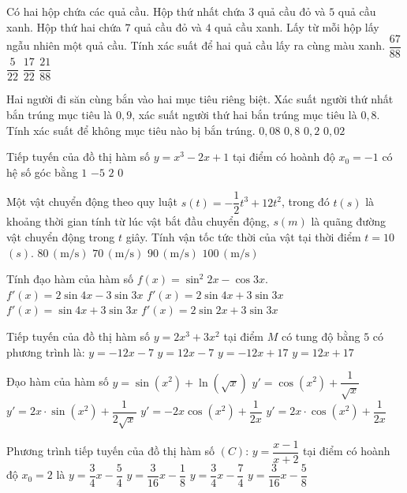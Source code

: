 \begin{ex}
Có hai hộp chứa các quả cầu. Hộp thứ nhất chứa $3$ quả cầu đỏ và $5$ quả cầu xanh. Hộp thứ hai chứa $7$ quả cầu đỏ và $4$ quả cầu xanh. Lấy từ mỗi hộp lấy ngẫu nhiên một quả cầu. Tính xác suất để hai quả cầu lấy ra cùng màu xanh.
\choice
{$\dfrac{67}{88}$}
{$\dfrac{5}{22}$}
{$\dfrac{17}{22}$}
{$\dfrac{21}{88}$}
\end{ex}
\begin{ex}
Hai người đi săn cùng bắn vào hai mục tiêu riêng biệt. Xác suất người thứ nhất bắn trúng mục tiêu là $0{,}9$, xác suất người thứ hai bắn trúng mục tiêu là $0{,}8$. Tính xác suất để không mục tiêu nào bị bắn trúng.
\choice
{$0{,}08$}
{$0{,}8$}
{$0{,}2$}
{$0{,}02$}
\end{ex}
\begin{ex}
Tiếp tuyến của đồ thị hàm số $y=x^3-2x+1$ tại điểm có hoành độ $x_0=-1$ có hệ số góc bằng
\choice
{$1$}
{$-5$}
{$2$}
{$0$}
\end{ex}
\begin{ex}
Một vật chuyển động theo quy luật $s(t)=-\dfrac{1}{2}t^3+12t^2$, trong đó $t(s)$ là khoảng thời gian tính từ lúc vật bắt đầu chuyển động, $s(m)$ là quãng đường vật chuyển động trong $t$ giây. Tính vận tốc tức thời của vật tại thời điểm $t=10$ $(s)$.
\choice
{$80\,\left(\text{m/s}\right)$}
{$70\,\left(\text{m/s}\right)$}
{$90\,\left(\text{m/s}\right)$}
{$100\,\left(\text{m/s}\right)$}
\end{ex}
\begin{ex}
Tính đạo hàm của hàm số $f(x)=\sin^2 2x-\cos 3x$.
\choice
{$f'(x)=2\sin 4x-3\sin 3x$}
{$f'(x)=2\sin 4x+3\sin 3x$}
{$f'(x)=\sin 4x+3\sin 3x$}
{$f'(x)=2\sin 2x+3\sin 3x$}
\end{ex}
\begin{ex}
Tiếp tuyến của đồ thị hàm số $y=2x^3+3x^2$ tại điểm $M$ có tung độ bằng $5$ có phương trình là:
\choice
{$y=-12x-7$}
{$y=12x-7$}
{$y=-12x+17$}
{$y=12x+17$}
\end{ex}
\begin{ex}
Đạo hàm của hàm số $y=\sin \left(x^2\right)+\ln \left(\sqrt{x}\right)$
\choice
{$y'=\cos \left(x^2\right)+\dfrac{1}{\sqrt{x}}$}
{$y'=2x \cdot \sin \left(x^2\right)+\dfrac{1}{2\sqrt{x}}$}
{$y'=-2x\cos \left(x^2\right)+\dfrac{1}{2x}$}
{$y'=2x \cdot \cos \left(x^2\right)+\dfrac{1}{2x}$}
\end{ex}
\begin{ex}
Phương trình tiếp tuyến của đồ thị hàm số $(C)\colon \,y=\dfrac{x-1}{x+2}$ tại điểm có hoành độ $x_0=2$ là
\choice
{$y=\dfrac{3}{4}x-\dfrac{5}{4}$}
{$y=\dfrac{3}{16}x-\dfrac{1}{8}$}
{$y=\dfrac{3}{4}x-\dfrac{7}{4}$}
{$y=\dfrac{3}{16}x-\dfrac{5}{8}$}
\end{ex}
